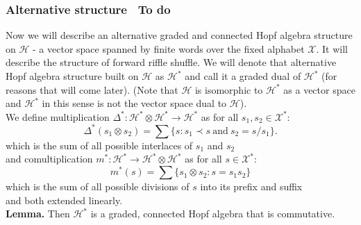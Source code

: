 \documentclass[a4paper, 12pt]{article}
\newcommand{\smalltodo}[1]{\textbf{\ To do}}
\begin{document}
\subsubsection{Alternative structure \smalltodo{a}}
\indent Now we will describe an alternative graded and connected Hopf algebra structure on $\mathcal{H}$ - a
vector space spanned
by finite words over the fixed alphabet $\mathcal{X}$. It will describe the structure of forward riffle
shuffle.
We will denote that alternative Hopf algebra structure
built on $\mathcal{H}$ as $\mathcal{H}^*$ and call it a graded dual of $\mathcal{H}^*$ (for reasons that
will come later).
(Note that $\mathcal{H}$ is isomorphic to $\mathcal{H}^*$ as a vector space and $\mathcal{H}^*$ in this
sense is not the vector space dual to $\mathcal{H}$). \\
We define multiplication $\Delta^* : \mathcal{H}^* \otimes \mathcal{H}^* \to \mathcal{H}^*$ as
for all $s_1, s_2 \in \mathcal{X}^*$:
\begin{equation*}
\Delta^*(s_1 \otimes s_2) = \sum\{s : s_1 \prec s \mathrm{\ and\ } s_2 = s/s_1\}.
\end{equation*}
which is the sum of all possible interlaces of $s_1$ and $s_2$ \\
and comultiplication $m^* : \mathcal{H}^* \to \mathcal{H}^* \otimes \mathcal{H}^*$ as for all $s \in
\mathcal{X}^*$:
\begin{equation*}
m^*(s) = \sum\{ s_1 \otimes s_2 : s=s_1s_2 \}
\end{equation*}
which is the sum of all possible divisions of $s$ into its prefix and suffix \\
and both extended linearly. \\
\textbf{Lemma. } Then $\mathcal{H}^*$ is a graded, connected Hopf algebra that is commutative.
\end{document}
